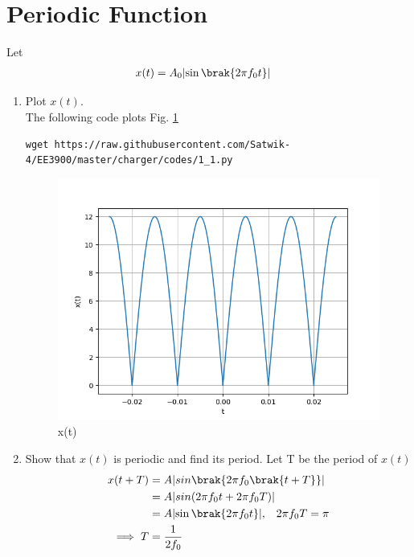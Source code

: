 \documentclass[journal,12pt,twocolumn]{IEEEtran}
\DeclarePairedDelimiter\abs{\lvert}{\rvert}%
\renewcommand\thesection{\arabic{section}}
\begin{document}
\section{Periodic Function}
Let 
\begin{align}
	x(t) &= A_0\abs{\sin\brak{2\pi f_0 t}}\label{eq:10-orig-diff-def}
\end{align}
\begin{enumerate}[label=\thesection.\arabic*
,ref=\thesection.\theenumi]
\item Plot $x(t)$.
\\\solution The following code plots Fig. \ref{fig:xt}
	\begin{lstlisting}
wget https://raw.githubusercontent.com/Satwik-4/EE3900/master/charger/codes/1_1.py
\end{lstlisting}
	\begin{figure}[h!]
	    \centering
	    \includegraphics[width=\columnwidth]{figures/1_1.png}
	    \caption{x(t) }
	    \label{fig:xt}
	\end{figure}

\item Show that $x(t)$ is periodic and find its period.
Let T be the period of $x(t)$
\begin{align}
    x(t+T) &= A\abs{sin\brak{2\pi f_0\brak{t+T}}}\\
    &= A\abs{sin(2\pi f_0t+2\pi f_0T)}\\
    &= A\abs{\sin\brak{2\pi f_0 t}} \text,\quad 2\pi f_0T=\pi\\
    \implies T&= \frac{1}{2f_0}
\end{align}
\end{enumerate}
\end{document}
